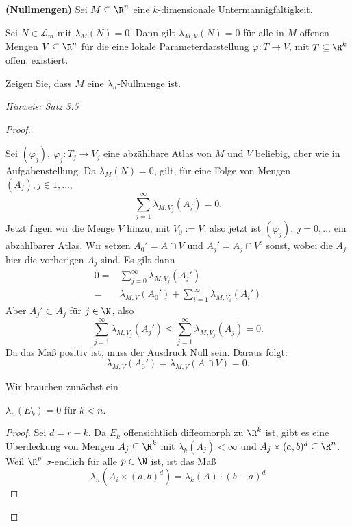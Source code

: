 \begin{Problem}\label{pr:advanalblatt13-1}
	\textbf{(Nullmengen)} Sei $M\subseteq \R^n$ eine $k$-dimensionale Untermannigfaltigkeit.
	\begin{parts}
		\item Sei $N\in \mathcal{L}_m$ mit $\lambda_M(N)=0$. Dann gilt $\lambda_{M,V}(N)=0$ f\"{u}r alle in $M$ offenen Mengen $V\subseteq \R^n$ f\"{u}r die eine lokale Parameterdarstellung $\varphi:T\to V$, mit $T\subseteq \R^k$ offen, existiert.
		\item Zeigen Sie, dass $M$ eine $\lambda_n$-Nullmenge ist.
			
			{\footnotesize \emph{Hinweis: Satz 3.5}}
	\end{parts}
\end{Problem}
\begin{proof}
	\begin{parts}
	\item Sei $(\varphi_j),~\varphi_j:T_j\to V_j$ eine abzählbare Atlas von $M$ und $V $ beliebig, aber wie in Aufgabenstellung.  Da $\lambda_M(N)=0$, gilt, f\"{u}r eine Folge von Mengen $(A_j), j\in 1,\dots$,
		\[
			\sum_{j=1}^\infty \lambda_{M,V_j}(A_j)=0
		.\] 
		Jetzt fügen wir die Menge $V$ hinzu, mit $V_0:=V$, also jetzt ist $(\varphi_j),~j=0,\dots$ ein abzählbarer Atlas. Wir setzen $A_0'=A\cap V$ und  $A_j'=A_j\cap V^c$ sonst, wobei die $A_j$ hier die vorherigen $A_j$ sind. Es gilt dann
		\begin{align*}
			0=&\sum_{j=0}^\infty \lambda_{M,V_j}(A_j')\\
			=&\lambda_{M,V}(A_0')+\sum_{i=1}^\infty \lambda_{M,V_i}(A_i')
		\end{align*}
		Aber $A_j'\subset A_j$ f\"{u}r $j\in \N$, also
		\[
			\sum_{j=1}^\infty \lambda_{M,V_j}(A_j')\le \sum_{j=1}^\infty \lambda_{M,V_j}(A_j)=0
		.\] 
		Da das Maß positiv ist, muss der Ausdruck Null sein. Daraus folgt:
		\[
			\lambda_{M,V}(A_0')=\lambda_{M,V}(A\cap V)=0
		.\] 
	\item Wir brauchen zunächst ein
		\begin{tcolorbox}
		\begin{Lemma}
			$\lambda_n(E_k)=0$ f\"{u}r $k<n$. 
		\end{Lemma}
		\begin{proof}
			Sei $d=r-k$. Da $E_k$ offensichtlich diffeomorph zu $\R^k$ ist, gibt es eine Überdeckung von Mengen $A_j\subseteq \R^k$ mit $\lambda_k(A_j)<\infty$ und $A_j\times (a,b)^d\subseteq \R^n $. Weil $\R^p$ $\sigma$-endlich f\"{u}r alle $p\in \N$ ist, ist das Maß
			\[
			\lambda_n(A_i\times (a,b)^d)=\lambda_k(A)\cdot (b-a)^d
\]
\end{proof}
\end{tcolorbox}
\end{parts}
\end{proof}
